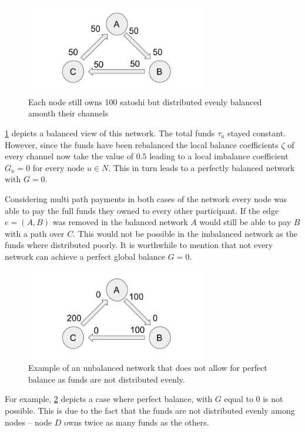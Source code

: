 \documentclass[a4paper]{paper}
\begin{document}
\begin{figure}
 \centering
 \includegraphics[width=8cm]{img/evenBalanced.png}
 \caption{Each node still owns 100 satoshi but distributed evenly balanced amonth their channels}
 \label{fig:evenBalanced}
\end{figure}

\cref{fig:evenBalanced} depicts a balanced view of this network.
The total funds $\tau_u$ stayed constant.
However, since the funds have been rebalanced the local balance coefficients $\zeta$ of every channel now take the value of $0.5$ leading to a local imbalance coefficient $G_u=0$ for every node $u\in N$.
This in turn leads to a perfectly balanced network with $G=0$.

Considering multi path payments in both cases of the network every node was able to pay the full funds they owned to every other participant.
If the edge $e=(A,B)$ was removed in the balanced network $A$ would still be able to pay $B$ with a path over $C$.
This would not be possible in the imbalanced network as the funds where distributed poorly.
It is worthwhile to mention that not every network can achieve a perfect global balance $G=0$.

\begin{figure}
 \centering
 \includegraphics[width=8cm]{img/oddUnbalanced.png}
 \caption{Example of an unbalanced network that does not allow for perfect balance as funds are not distributed evenly.}
 \label{fig:oddUnbalanced}
\end{figure}

For example, \cref{fig:oddUnbalanced} depicts a case where perfect balance, with $G$ equal to $0$  is not possible. 
This is due to the fact that the funds are not distributed evenly among nodes -- node $D$ owns twice as many funds as the others.
\end{document}
